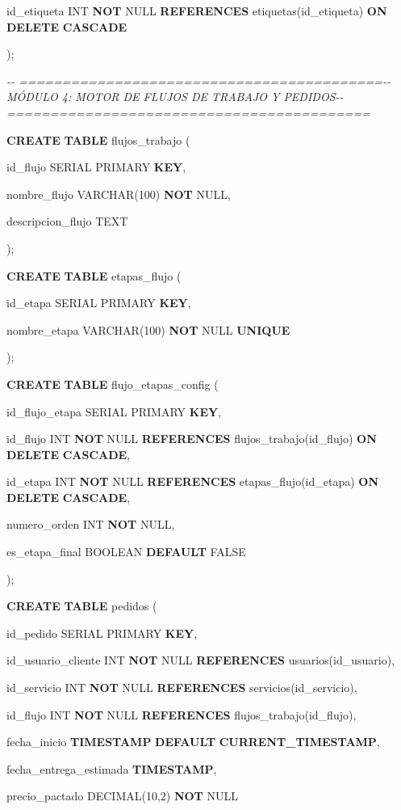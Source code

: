 \documentclass[
]{article}
\begin{document}
id\_etiqueta INT \textbf{NOT} NULL \textbf{REFERENCES}
etiquetas(id\_etiqueta) \textbf{ON} \textbf{DELETE} \textbf{CASCADE}

);

\emph{-\/- ==========================================-\/- MÓDULO 4:
MOTOR DE FLUJOS DE TRABAJO Y PEDIDOS-\/-
==========================================}

\textbf{CREATE} \textbf{TABLE} flujos\_trabajo (

id\_flujo SERIAL PRIMARY \textbf{KEY},

nombre\_flujo VARCHAR(100) \textbf{NOT} NULL,

descripcion\_flujo TEXT

);

\textbf{CREATE} \textbf{TABLE} etapas\_flujo (

id\_etapa SERIAL PRIMARY \textbf{KEY},

nombre\_etapa VARCHAR(100) \textbf{NOT} NULL \textbf{UNIQUE}

);

\textbf{CREATE} \textbf{TABLE} flujo\_etapas\_config (

id\_flujo\_etapa SERIAL PRIMARY \textbf{KEY},

id\_flujo INT \textbf{NOT} NULL \textbf{REFERENCES}
flujos\_trabajo(id\_flujo) \textbf{ON} \textbf{DELETE} \textbf{CASCADE},

id\_etapa INT \textbf{NOT} NULL \textbf{REFERENCES}
etapas\_flujo(id\_etapa) \textbf{ON} \textbf{DELETE} \textbf{CASCADE},

numero\_orden INT \textbf{NOT} NULL,

es\_etapa\_final BOOLEAN \textbf{DEFAULT} FALSE

);

\textbf{CREATE} \textbf{TABLE} pedidos (

id\_pedido SERIAL PRIMARY \textbf{KEY},

id\_usuario\_cliente INT \textbf{NOT} NULL \textbf{REFERENCES}
usuarios(id\_usuario),

id\_servicio INT \textbf{NOT} NULL \textbf{REFERENCES}
servicios(id\_servicio),

id\_flujo INT \textbf{NOT} NULL \textbf{REFERENCES}
flujos\_trabajo(id\_flujo),

fecha\_inicio \textbf{TIMESTAMP} \textbf{DEFAULT}
\textbf{CURRENT\_TIMESTAMP},

fecha\_entrega\_estimada \textbf{TIMESTAMP},

precio\_pactado DECIMAL(10,2) \textbf{NOT} NULL
\end{document}
